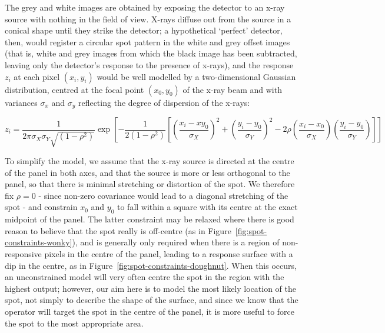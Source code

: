 \documentclass[\main/IO-Pixels.tex]{subfiles}
\begin{document}

The grey and white images are obtained by exposing the detector to an x-ray source with nothing in the field of view. X-rays diffuse out from the source in a conical shape until they strike the detector; a hypothetical `perfect' detector,  then, would register a circular spot pattern in the white and grey offset images (that is, white and grey images from which the black image has been subtracted, leaving only the detector's response to the presence of x-rays), and the response $z_i$ at each pixel $(x_i, y_i)$ would be well modelled by a two-dimensional Gaussian distribution, centred at the focal point $(x_0, y_0)$ of the x-ray beam and with variances $\sigma_x$ and $\sigma_y$ reflecting the degree of dispersion of the x-rays:

\[ z_i = \frac{1}{2\pi \sigma_X \sigma_Y \sqrt{(1-\rho^2)}} \exp \left[ -\frac{1}{2(1-\rho^2)} \left[ \left(\frac{x_i-xy_0}{\sigma_X}\right)^2 + \left(\frac{y_i-y_0}{\sigma_Y}\right)^2 - 2\rho\left(\frac{x_i-x_0}{\sigma_X} \right) \left(\frac{y_i-y_0}{\sigma_Y} \right) \right] \right] \]

To simplify the model, we assume that the x-ray source is directed at the centre of the panel in both axes, and that the source is more or less orthogonal to the panel, so that there is minimal stretching or distortion of the spot. We therefore fix $\rho = 0$ - since non-zero covariance would lead to a diagonal stretching of the spot - and constrain $x_0$ and $y_0$ to fall within a square with its centre at the exact midpoint of the panel. The latter constraint may be relaxed where there is good reason to believe that the spot really is off-centre (as in Figure~\ref{fig:spot-constraints-wonky}), and is generally only required when there is a region of non-responsive pixels in the centre of the panel, leading to a response surface with a dip in the centre, as in Figure~\ref{fig:spot-constraints-doughnut}. When this occurs, an unconstrained model will very often centre the spot in the region with the highest output; however, our aim here is to model the most likely location of the spot, not simply to describe the shape of the surface, and since we know that the operator will target the spot in the centre of the panel, it is more useful to force the spot to the most appropriate area. 
\end{document}
